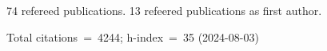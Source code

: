 74 refereed publications. 13 refeered publications as first author.

Total citations~=~4244; h-index~=~35 (2024-08-03)